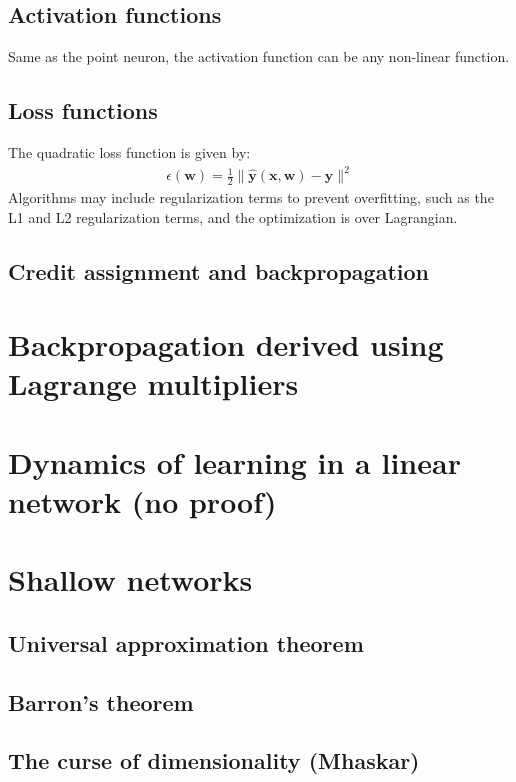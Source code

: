 \documentclass[11pt]{book} %
\begin{document}
\subsection{Activation functions}
Same as the point neuron, the activation function can be any non-linear function.

\subsection{Loss functions}
The quadratic loss function is given by:
\begin{align*}
    \epsilon(\mathbf{w}) = \frac{1}{2} \lVert \hat{\mathbf{y}}(\mathbf{x}, \mathbf{w}) - \mathbf{y} \rVert^2
\end{align*}
Algorithms may include regularization terms to prevent overfitting, such as the L1 and L2 regularization terms, and the optimization is over Lagrangian.

\subsection{Credit assignment and backpropagation}

\section{Backpropagation derived using Lagrange multipliers}

\section{Dynamics of learning in a linear network (no proof)}

\section{Shallow networks}
\subsection{Universal approximation theorem}
\subsection{Barron's theorem}
\subsection{The curse of dimensionality (Mhaskar)}

%
%
%
\end{document}
